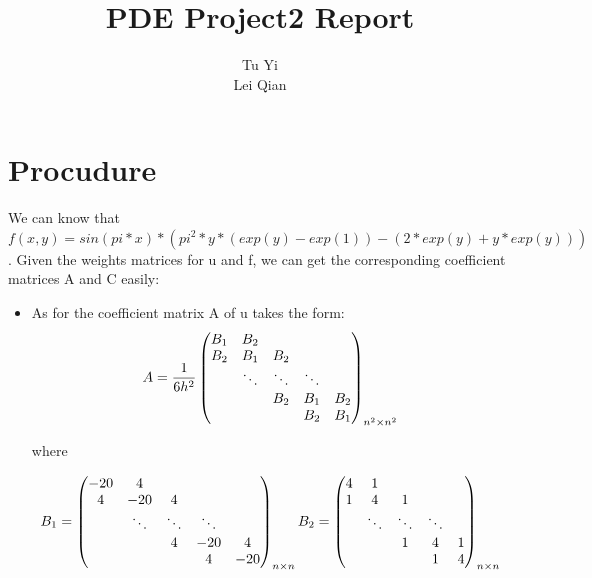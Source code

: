 \documentclass[12pt]{report}
\title{PDE Project2 Report}
\author{Tu Yi\\Lei Qian}
\theoremstyle{definition}
\begin{document}
\maketitle

\section{Procudure}

We can know that $f(x,y)= sin(pi*x) * (pi^2 * y * (exp(y) - exp(1)) - (2*exp(y) + y* exp(y))) $.
Given the weights matrices for u and f, we can get the corresponding coefficient matrices A and C easily:\\
\begin{itemize}
	\item As for the coefficient matrix A of u takes the form:
	\begin{equation*}
	A = \frac{1}{6h^2} 
	\begin{pmatrix}
	B_1 & B_2 \\
	B_2 & B_1 & B_2 \\
	& \ddots & \ddots & \ddots \\
	&&B_2 & B_1 & B_2 \\
	&&&B_2 & B_1  \\
	\end{pmatrix}_{n^2 \times n^2}\\
	\end{equation*}
	
	where
	
	\begin{equation*}
	B_1 = \begin{pmatrix} 
	-20 & 4 \\
	4 & -20 & 4 \\
	& \ddots & \ddots & \ddots \\
	&&4 & -20 & 4 \\
	&&&4 & -20  \\
	\end{pmatrix}_{n \times n}\\
	B_2= \begin{pmatrix}
	4 & 1 \\
	1 & 4 & 1 \\
	& \ddots & \ddots & \ddots \\
	&&1 & 4 & 1 \\
	&&&1 & 4  \\
	\end{pmatrix}_{n \times n}\\
	\end{equation*}
	

\end{itemize}
\end{document}

